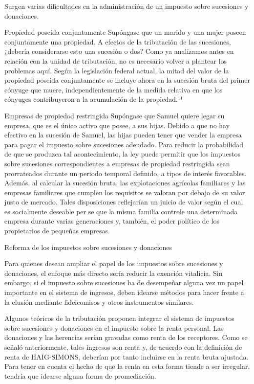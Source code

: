 \documentclass[10pt,a4paper]{article}
\begin{document}
Surgen varias dificultades en la administración de un impuesto sobre sucesiones y donaciones.

Propiedad poseída conjuntamente 
Supóngase que un marido y una mujer poseen conjuntamente una propiedad. A efectos de la tributación de las sucesiones, ¿debería considerarse esto una sucesión o dos? Como ya analizamos antes en relación con la unidad de tributación, no es necesario volver a plantear los problemas aquí. Según la legislación federal actual, la mitad del valor de la propiedad poseída conjuntamente se incluye ahora en la sucesión bruta del primer cónyuge que muere, independientemente de la medida relativa en que los cónyuges contribuyeron a la acumulación de la propiedad.¹¹

Empresas de propiedad restringida 
Supóngase que Samuel quiere legar su empresa, que es el único activo que posee, a sus hijas. Debido a que no hay efectivo en la sucesión de Samuel, las hijas pueden tener que vender la empresa para pagar el impuesto sobre sucesiones adeudado. Para reducir la probabilidad de que se produzca tal acontecimiento, la ley puede permitir que los impuestos sobre sucesiones correspondientes a empresas de propiedad restringida sean prorrateados durante un periodo temporal definido, a tipos de interés favorables. Además, al calcular la sucesión bruta, las explotaciones agrícolas familiares y las empresas familiares que cumplen los requisitos se valoran por debajo de su valor justo de mercado. Tales disposiciones reflejarían un juicio de valor según el cual es socialmente deseable per se que la misma familia controle una determinada empresa durante varias generaciones y, también, el poder político de los propietarios de pequeñas empresas.




Reforma de los impuestos sobre sucesiones y donaciones

Para quienes desean ampliar el papel de los impuestos sobre sucesiones y donaciones, el enfoque más directo sería reducir la exención vitalicia. Sin embargo, si el impuesto sobre sucesiones ha de desempeñar alguna vez un papel importante en el sistema de ingresos, deben idearse métodos para hacer frente a la elusión mediante fideicomisos y otros instrumentos similares.

Algunos teóricos de la tributación proponen integrar el sistema de impuestos sobre sucesiones y donaciones en el impuesto sobre la renta personal. Las donaciones y las herencias serían gravadas como renta de los receptores. Como se señaló anteriormente, tales ingresos son renta y, de acuerdo con la definición de renta de HAIG-SIMONS, deberían por tanto incluirse en la renta bruta ajustada. Para tener en cuenta el hecho de que la renta en esta forma tiende a ser irregular, tendría que idearse alguna forma de promediación.
\end{document}
